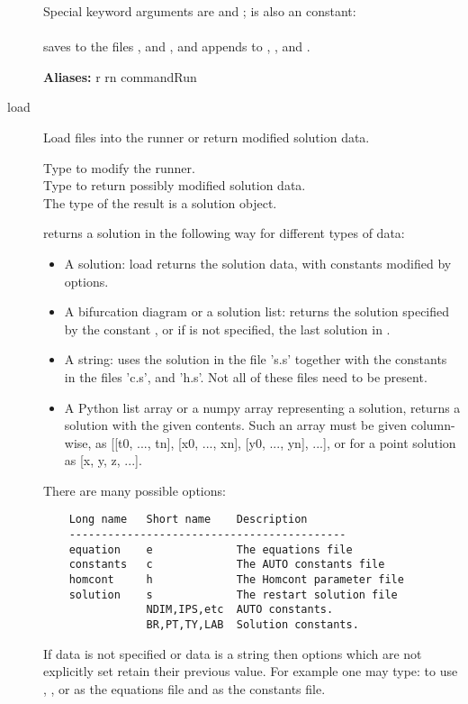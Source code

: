 \documentclass[12pt]{report}
\begin{document}
\begin{description}
    Special keyword arguments are  and ;  is also an \AUTO
    constant:\\
    \\
    saves to the files ,  and ,
    and appends to , , and .

    \textbf{Aliases:} r rn commandRun

\item[load]
Load files into the \AUTO runner or return modified solution data.

    Type  to modify the \AUTO runner.\\
    Type  to return possibly
    modified solution data.\\

    The type of the result is a solution object.

     returns a solution in the following way for
    different types of data:
    \begin{itemize}
    \item
      A solution: load returns the solution data, with \AUTO constants
      modified by options.
    \item
      A bifurcation diagram or a solution list:
      returns the solution specified by
      the \AUTO constant , or if  is not specified, the last solution
      in .
    \item
      A string: \AUTO uses the solution in the file 's.s' together with the
      constants in the files 'c.s', and 'h.s'. Not all of these
      files need to be present.
    \item
      A Python list array or a numpy array representing a solution,
      returns a solution with the given contents. Such an array must be given
      column-wise, as [[t0, ..., tn], [x0, ..., xn], [y0, ..., yn],
      ...], or for a point solution as [x, y, z, ...].
    \end{itemize}

    There are many possible options:
    \begin{verbatim}
    Long name   Short name    Description
    -------------------------------------------
    equation    e             The equations file
    constants   c             The AUTO constants file
    homcont     h             The Homcont parameter file
    solution    s             The restart solution file
                NDIM,IPS,etc  AUTO constants.
                BR,PT,TY,LAB  Solution constants.
    \end{verbatim}
    If data is not specified or data is a string then options which
    are not explicitly set retain their previous value.
    For example one may type:  to
    use , , or  as
    the equations file and  as the constants file.


\end{description}
\end{document}
